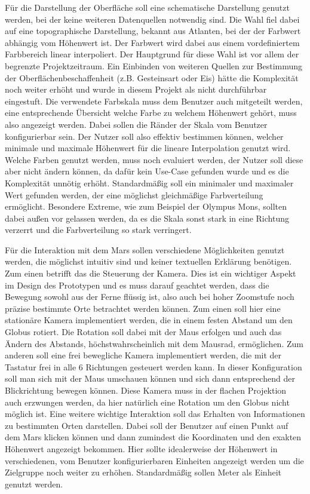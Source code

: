 Für die Darstellung der Oberfläche soll eine schematische Darstellung genutzt werden, bei der keine weiteren Datenquellen notwendig sind. Die Wahl fiel dabei auf eine topographische Darstellung, bekannt aus Atlanten, bei der der Farbwert abhängig vom Höhenwert ist. Der Farbwert wird dabei aus einem vordefiniertem Farbbereich linear interpoliert. Der Hauptgrund für diese Wahl ist vor allem der begrenzte Projektzeitraum. Ein Einbinden von weiteren Quellen zur Bestimmung der Oberflächenbeschaffenheit (z.B. Gesteinsart oder Eis) hätte die Komplexität noch weiter erhöht und wurde in diesem Projekt als nicht durchführbar eingestuft. Die verwendete Farbskala muss dem Benutzer auch mitgeteilt werden, eine entsprechende Übersicht welche Farbe zu welchem Höhenwert gehört, muss also angezeigt werden. Dabei sollen die Ränder der Skala vom Benutzer konfigurierbar sein. Der Nutzer soll also effektiv bestimmen können, welcher minimale und maximale Höhenwert für die lineare Interpolation genutzt wird. Welche Farben genutzt werden, muss noch evaluiert werden, der Nutzer soll diese aber nicht ändern können, da dafür kein Use-Case gefunden wurde und es die Komplexität unnötig erhöht. Standardmäßig soll ein minimaler und maximaler Wert gefunden werden, der eine möglichst gleichmäßige Farbverteilung ermöglicht. Besondere Extreme, wie zum Beispiel der Olympus Mons, sollten dabei außen vor gelassen werden, da es die Skala sonst stark in eine Richtung verzerrt und die Farbverteilung so stark verringert.

Für die Interaktion mit dem Mars sollen verschiedene Möglichkeiten genutzt werden, die möglichst intuitiv sind und keiner textuellen Erklärung benötigen. Zum einen betrifft das die Steuerung der Kamera. Dies ist ein wichtiger Aspekt im Design des Prototypen und es muss darauf geachtet werden, dass die Bewegung sowohl aus der Ferne flüssig ist, also auch bei hoher Zoomstufe noch präzise bestimmte Orte betrachtet werden können. Zum einen soll hier eine stationäre Kamera implementiert werden, die in einem festen Abstand um den Globus rotiert. Die Rotation soll dabei mit der Maus erfolgen und auch das Ändern des Abstands, höchstwahrscheinlich mit dem Mausrad, ermöglichen. Zum anderen soll eine frei bewegliche Kamera implementiert werden, die mit der Tastatur frei in alle 6 Richtungen gesteuert werden kann. In dieser Konfiguration soll man sich mit der Maus umschauen können und sich dann entsprechend der Blickrichtung bewegen können. Diese Kamera muss in der flachen Projektion auch erzwungen werden, da hier natürlich eine Rotation um den Globus nicht möglich ist. Eine weitere wichtige Interaktion soll das Erhalten von Informationen zu bestimmten Orten darstellen. Dabei soll der Benutzer auf einen Punkt auf dem Mars klicken können und dann zumindest die Koordinaten und den exakten Höhenwert angezeigt bekommen. Hier sollte idealerweise der Höhenwert in verschiedenen, vom Benutzer konfigurierbaren Einheiten angezeigt werden um die Zielgruppe noch weiter zu erhöhen. Standardmäßig sollen Meter als Einheit genutzt werden.

